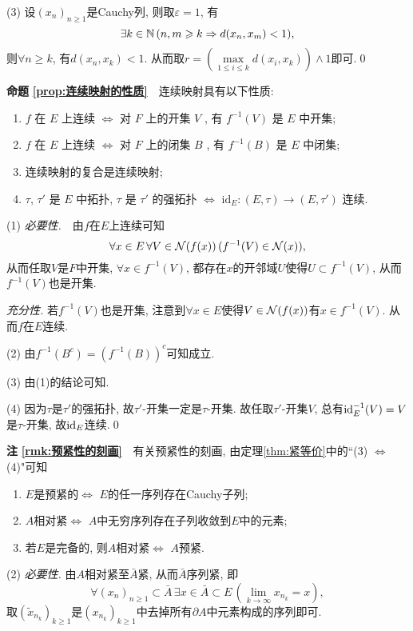 \begin{appendix}
\begin{Proof}
	(3) 设$ (x_n)_{n\geqslant 1} $是Cauchy列, 则取$ \varepsilon=1 $, 有
	\[
	\exists k\in\mathbb{N}\,(n,m\geqslant k\Rightarrow d(x_n,x_m)<1),
	\]
	则$ \forall n\geqslant k $, 有$ d(x_n,x_k)<1 $. 从而取$ r=\left(\max\limits_{1\leqslant i\leqslant k}d(x_i,x_k)\right)\land 1 $即可.\qed
	\end{Proof}
	
	\textbf{命题\,\,\ref{prop:连续映射的性质}}\ \ 连续映射具有以下性质:
		\begin{enumerate}[(1)]
	    \item $ f $ 在 $ E $ 上连续 $ \Longleftrightarrow $ 对 $ F $ 上的开集 $ V $ , 有 $ f^{-1}(V) $ 是 $ E $ 中开集;
	    \item $ f $ 在 $ E $ 上连续 $ \Longleftrightarrow $ 对 $ F $ 上的闭集 $ B $ , 有 $ f^{-1}(B) $ 是 $ E $ 中闭集;
	    \item 连续映射的复合是连续映射;
	    \item $ \tau $, $ \tau' $ 是 $ E $ 中拓扑,  $ \tau $ 是 $ \tau' $ 的强拓扑 $ \Longleftrightarrow $ $ \mathrm{id}_{E}:(E, \tau)\to(E, \tau') $ 连续. 
		\end{enumerate}
	\begin{Proof}
	(1) \textsl{必要性.}\ \ 由$ f $在$ E $上连续可知
	\[
	\forall x\in E\,\forall V\in\mathcal{N}(f(x))\,(f^{-1}(V)\in\mathcal{N}(x)),
	\]
	从而任取$ V $是$ F $中开集, $ \forall x\in f^{-1}(V) $, 都存在$ x $的开邻域$ U $使得$ U\subset f^{-1}(V) $, 从而$ f^{-1}(V) $也是开集.
	
	\textsl{充分性.} 若$ f^{-1}(V) $也是开集, 注意到$ \forall x\in E $使得$ V\in\mathcal{N}(f(x)) $有$ x\in f^{-1}(V) $. 从而$ f $在$ E $连续.
	
	(2) 由$ f^{-1}(B^c)=(f^{-1}(B))^c $可知成立.
	
	(3) 由(1)的结论可知.
	
	(4) 因为$ \tau $是$ \tau' $的强拓扑, 故$ \tau' $-开集一定是$ \tau $-开集. 故任取$ \tau' $-开集$ V $, 总有$ \mathrm{id}_E^{-1}(V)=V $是$ \tau $-开集, 故$ \mathrm{id}_E $连续.\qed
	\end{Proof}
	
	\textbf{注\,\,\ref{rmk:预紧性的刻画}}\ \ 有关预紧性的刻画, 由定理\ref{thm:紧等价}中的``(3) $ \Leftrightarrow $ (4)"可知
	\begin{enumerate}[(1)]
	\item $ E $是预紧的$ \Longleftrightarrow $ $ E $的任一序列存在Cauchy子列;
	\item $ A $相对紧$ \Longleftrightarrow $ $ A $中无穷序列存在子列收敛到$ E $中的元素;
	\item 若$ E $是完备的, 则$ A $相对紧$ \Longleftrightarrow $ $ A $预紧.
	\end{enumerate}
	\begin{Proof}
	(2) \textsl{必要性.} 由$ A $相对紧至$ \bar{A} $紧, 从而$ \bar{A} $序列紧, 即
	\[
	\forall (x_n)_{n\geqslant 1}\subset\bar{A}\,\exists x\in\bar{A}\subset E\,(\lim_{k\to\infty}x_{n_k}=x),
	\]
	取$ (\tilde{x}_{n_k})_{k\geqslant 1} $是$ (x_{n_k})_{k\geqslant 1} $中去掉所有$ \partial A $中元素构成的序列即可.
	

\end{Proof}
\end{appendix}
